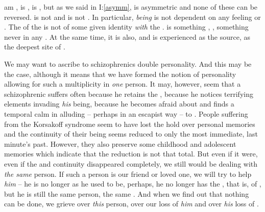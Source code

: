 
\pa\label{asymSelf}  am ,  is ,
 is , but as we said in I:\ref{asymm},  is
asymmetric and none of these can be reversed.  is not  and
 is not . In particular, {\em being}  is not
dependent on any feeling or .  The  of the
 is not  of some given identity {\em with} the
.   is something  , 
, something never  in any . At the same
time, it is also, and is experienced as the 
source, as the deepest site of  .

We may want to ascribe to schizophrenics double personality. And this may be the
case, although it means that we have formed the notion of personality allowing
for such a multiplicity in {\em one} person. It may, however, seem that a schizophrenic
suffers often because he retains the , because he notices
terrifying elements invading {\em his} being, because he becomes afraid about
 and finds a temporal calm in alluding -- perhaps in an escapist way
-- to .  People suffering from the Korsakoff syndrome seem to have
lost the hold over personal memories and the continuity of their being seems
reduced to only the most immediate, last minute's past. However, they also
preserve some childhood and adolescent memories which indicate that the
reduction is not that total. But even if it were, even if the  and continuity disappeared completely, we still would be dealing with
{\em the same} person. If such a person is our friend or loved one, we will try
to help {\em him} -- he is no longer  as he used to be, perhaps, he
no longer has the , that is, of , but he is still
the same person, the same .  And when we find out that nothing can
be done, we grieve over {\em this} person, over our loss of {\em him} and over
{\em his} loss of .

